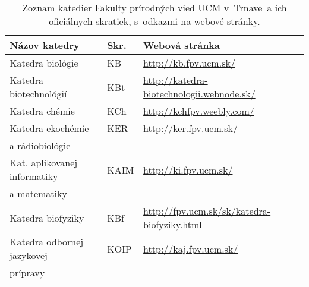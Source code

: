 \begin{table}
  \centering\small
  \caption[Zoznam katedier FPV]%
  {Zoznam katedier Fakulty prírodných vied UCM v~Trnave~a ich oficiálnych skratiek, s~odkazmi na webové stránky.}
  \label{tab:department.review}
  \begin{tabularx}{\textwidth}{lll}
    \toprule
    Názov katedry & Skr. & Webová stránka \\
    \midrule
    Katedra biológie             & KB   & {\footnotesize \url{http://kb.fpv.ucm.sk/}}                       \\[0.5ex]
    Katedra biotechnológií       & KBt  & {\footnotesize \url{http://katedra-biotechnologii.webnode.sk/}}   \\[0.5ex]
    Katedra chémie               & KCh  & {\footnotesize \url{http://kchfpv.weebly.com/}}                   \\[0.5ex]
    Katedra ekochémie            & KER  & {\footnotesize \url{http://ker.fpv.ucm.sk/}}                      \\[-0.25ex]
    a rádiobiológie              &      &                                                                   \\[0.5ex]
    Kat. aplikovanej informatiky & KAIM & {\footnotesize \url{http://ki.fpv.ucm.sk/}}                       \\[-0.25ex]
    a matematiky                 &      &                                                                   \\[0.5ex]
    Katedra biofyziky            & KBf  & {\footnotesize \url{http://fpv.ucm.sk/sk/katedra-biofyziky.html}} \\[0.5ex]
    Katedra odbornej jazykovej   & KOIP & {\footnotesize \url{http://kaj.fpv.ucm.sk/}}                      \\[-0.25ex]
    prípravy                     &      &                                                                   \\
    \bottomrule
  \end{tabularx}
\end{table}

